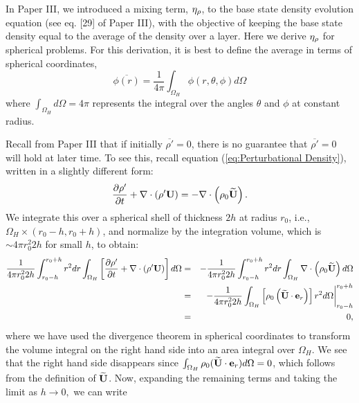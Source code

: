 In Paper III, we introduced a mixing term, $\eta_{\rho}$, to the base state density
evolution equation (see eq. [29] of Paper III), with the objective of
keeping the base state density equal to the average of the density
over a layer.  Here we derive $\eta_{\rho}$ for spherical problems.
For this derivation, it is best to define the average in terms of spherical coordinates,
\begin{equation}
\overline{\phi(r)} = \frac{1}{4\pi} \int_{\Omega_H} \phi(r,\theta,\phi) d\Omega
\end{equation}
where $\int_{\Omega_H} d\Omega = 4\pi$ represents the integral over
the angles $\theta$ and $\phi$ at constant radius.

Recall from Paper III that if initially $\overline{\rho'} = 0$,
there is no guarantee that $\overline{\rho'} = 0$ will hold at later
time.  To see this, recall equation (\ref{eq:Perturbational Density}),
written in a slightly different form:
\begin{equation}
\frac{\partial\rho'}{\partial t} + \nabla\cdot\left(\rho'{\bf U}\right) = -\nabla\cdot\left(\rho_0\widetilde{{\bf U}}\right).
\end{equation}
We integrate this over a spherical shell of thickness $2h$ at radius $r_0$, i.e.,
$\Omega_H \times (r_0-h, r_0+h)$, and normalize by the integration
volume, which is $\sim 4\pi r_0^2  2h$ for small $h$, to obtain:
\begin{eqnarray}
\frac{1}{4\pi r_0^2 2h}\int_{r_0-h}^{r_0+h}r^2 dr\int_{\Omega_H}\left[\frac{\partial\rho'}{\partial t} + \nabla\cdot\left(\rho'{\bf U}\right)\right]d\Omega 
&=& - \frac{1}{4\pi r_0^2 2h}\int_{r_0-h}^{r_0+h}r^2 dr\int_{\Omega_H}\nabla\cdot\left(\rho_0\widetilde{{\bf U}}\right)d\Omega \nonumber \\
&=& \left. -\frac{1}{4\pi r_0^2 2h}\int_{\Omega_H}\left[\rho_0\left(\widetilde{{\bf U}}\cdot{\bf e}_r\right)\right]r^2 d\Omega\right|_{r_0-h}^{r_0+h} \nonumber \\
&=& 0,
\end{eqnarray} 
where we have used the divergence theorem in spherical coordinates to transform
the volume integral on the right hand side into an area integral over $\Omega_H$.  
We see that the right hand side disappears since 
$\int_{\Omega_H}\rho_0(\widetilde{{\bf U}}\cdot{\bf e}_r)d\Omega=0$,  which follows from the definition 
of $\widetilde{{\bf U}}$.  Now, expanding the remaining terms and taking the limit as 
$h\rightarrow 0,$ we can write
